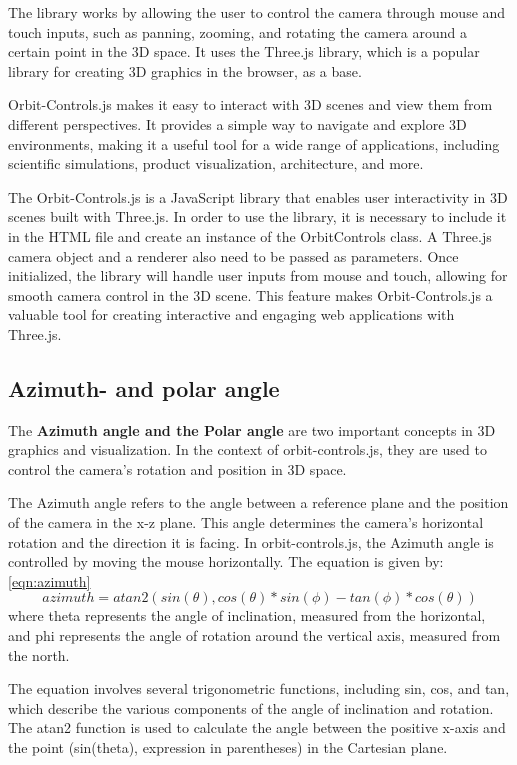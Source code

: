 The library works by allowing the user to control the camera through mouse 
and touch inputs, such as panning, zooming, and rotating the camera around a 
certain point in the 3D space. It uses the Three.js library, which is a popular 
library for creating 3D graphics in the browser, as a base.

Orbit-Controls.js makes it easy to interact with 3D scenes and view them from different 
perspectives. It provides a simple way to navigate and explore 3D environments, making it a 
useful tool for a wide range of applications, including scientific simulations, product visualization, architecture, and more.

The Orbit-Controls.js is a JavaScript library that enables user interactivity in 3D scenes built with Three.js. 
In order to use the library, it is necessary to include it in the HTML file and create an instance of the 
OrbitControls class. A Three.js camera object and a renderer also need to be passed as parameters. Once initialized, 
the library will handle user inputs from mouse and touch, allowing for smooth camera control in the 3D scene. 
This feature makes Orbit-Controls.js a valuable tool for creating interactive and engaging web applications with Three.js. \cite{orbitcontrols}

\subsection{Azimuth- and polar angle}
The \textbf{Azimuth angle and the Polar angle} are two important concepts in 3D graphics and visualization. 
In the context of orbit-controls.js, they are used to control the camera's rotation and position in 3D space.

The Azimuth angle refers to the angle between a reference plane and the position of the camera in 
the x-z plane. This angle determines the camera's horizontal rotation and the direction it is facing. 
In orbit-controls.js, the Azimuth angle is controlled by moving the mouse horizontally.
The equation is given by: \ref{eqn:azimuth}
\begin{equation}
  \label{eqn:azimuth}
	azimuth = atan2(sin(\theta), cos(\theta)*sin(\phi) - tan(\phi)*cos(\theta))
\end{equation}
where theta represents the angle of inclination, measured from the horizontal, and phi represents the angle 
of rotation around the vertical axis, measured from the north.

The equation involves several trigonometric functions, including sin, cos, and tan, which describe the various 
components of the angle of inclination and rotation. The atan2 function is used to calculate the angle between 
the positive x-axis and the point (sin(theta), expression in parentheses) in the Cartesian plane.

